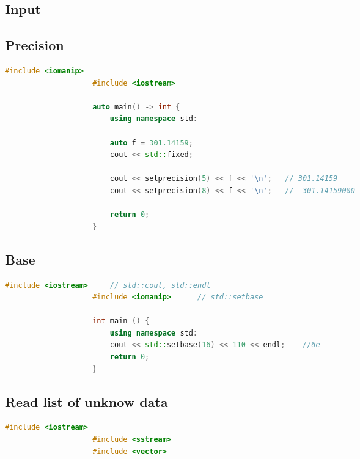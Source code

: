 \documentclass[11pt, fleqn]{report}                             %
\theoremstyle{break}                                            %
\begin{document}
\begin{multicols}{2}
            
                    
                
        \section{Input}

            \subsection{Precision}

                \begin{lstlisting}[language=C++, gobble=20]
                    #include <iomanip>
                    #include <iostream>

                    auto main() -> int {
                        using namespace std:

                        auto f = 301.14159;
                        cout << std::fixed;

                        cout << setprecision(5) << f << '\n';   // 301.14159
                        cout << setprecision(8) << f << '\n';   //  301.14159000     

                        return 0;
                    }
                \end{lstlisting}

            \subsection{Base}

                \begin{lstlisting}[language=C++, gobble=20]
                    #include <iostream>     // std::cout, std::endl
                    #include <iomanip>      // std::setbase

                    int main () {
                        using namespace std:
                        cout << std::setbase(16) << 110 << endl;    //6e
                        return 0;
                    }
                \end{lstlisting}

            \subsection{Read list of unknow data}

                \begin{lstlisting}[language=C++, gobble=20]
                    #include <iostream>
                    #include <sstream>
                    #include <vector>


\end{lstlisting}
\end{multicols}
\end{document}
